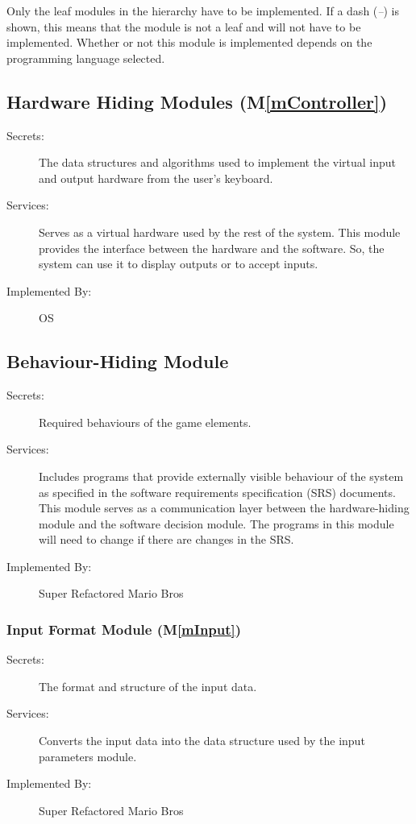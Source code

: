 \documentclass[12pt, titlepage]{article}
\newcommand{\mref}[1]{M\ref{#1}}
\begin{document}
Only the leaf modules in the
hierarchy have to be implemented. If a dash (\emph{--}) is shown, this means
that the module is not a leaf and will not have to be implemented. Whether or
not this module is implemented depends on the programming language
selected.

\subsection{Hardware Hiding Modules (\mref{mController})}

\begin{description}
\item[Secrets:]The data structures and algorithms used to implement the virtual input and output
  hardware from the user's keyboard.
\item[Services:]Serves as a virtual hardware used by the rest of the
  system. This module provides the interface between the hardware and the
  software. So, the system can use it to display outputs or to accept inputs.
\item[Implemented By:] OS
\end{description}

\subsection{Behaviour-Hiding Module}

\begin{description}
\item[Secrets:] Required behaviours of the game elements.
\item[Services:]Includes programs that provide externally visible behaviour of
  the system as specified in the software requirements specification (SRS)
  documents. This module serves as a communication layer between the
  hardware-hiding module and the software decision module. The programs in this
  module will need to change if there are changes in the SRS.
\item[Implemented By:] Super Refactored Mario Bros
\end{description}

\subsubsection{Input Format Module (\mref{mInput})}

\begin{description}
\item[Secrets:]The format and structure of the input data.
\item[Services:]Converts the input data into the data structure used by the
  input parameters module.
\item[Implemented By:] Super Refactored Mario Bros
\end{description}
\end{document}
